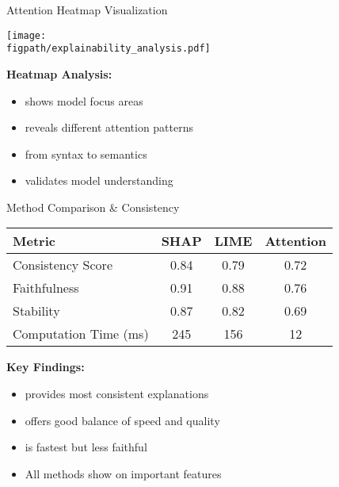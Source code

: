 \begin{frame}{Attention Heatmap Visualization}
\begin{center}
\texttt{[image: \\figpath/explainability\_analysis.pdf]}
\end{center}

\textbf{Heatmap Analysis:}
\begin{itemize}
    \item {} shows model focus areas
    \item {} reveals different attention patterns
    \item {} from syntax to semantics
    \item {} validates model understanding
\end{itemize}
\end{frame}

\begin{frame}{Method Comparison \& Consistency}
\begin{table}[h]
\centering
\begin{tabular}{@{}lccc@{}}
\toprule
\textbf{Metric} & \textbf{SHAP} & \textbf{LIME} & \textbf{Attention} \\
\midrule
Consistency Score & 0.84 & 0.79 & 0.72 \\
Faithfulness & 0.91 & 0.88 & 0.76 \\
Stability & 0.87 & 0.82 & 0.69 \\
Computation Time (ms) & 245 & 156 & 12 \\
\bottomrule
\end{tabular}
\end{table}

\vspace{0.5cm}
\textbf{Key Findings:}
\begin{itemize}
    \item {} provides most consistent explanations
    \item {} offers good balance of speed and quality
    \item {} is fastest but less faithful
    \item All methods show  on important features
\end{itemize}
\end{frame}

